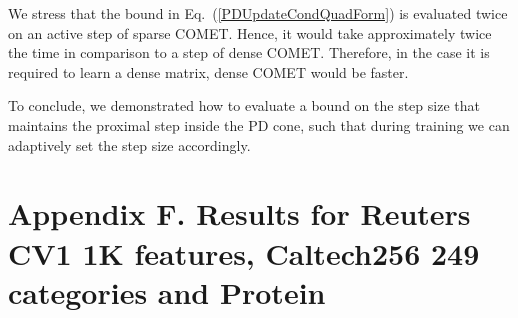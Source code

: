 \documentclass[twoside,11pt]{article}
\newcommand\mat[1]{{#1}}
\newcommand{\W}{\mat{W}}
\newcommand{\Hk}{H_k}
\newcommand{\Vk}{\mat{V_k}}
\renewcommand{\eqref}[1]{Eq.~(\ref{#1})}
\begin{document}

We stress that the bound in \eqref{PDUpdateCondQuadForm} is evaluated twice on an active step of sparse COMET. Hence, it would take approximately twice the time in comparison to a step of dense COMET. Therefore, in the case it is required to learn a dense matrix, dense COMET would be faster.

To conclude, we demonstrated how to evaluate a bound on the step size that maintains the proximal step inside the PD cone, such that during training we can adaptively set the step size accordingly.

\newpage
\section*{Appendix F. Results for Reuters CV1 1K features, Caltech256 249 categories and Protein}
\end{document}
